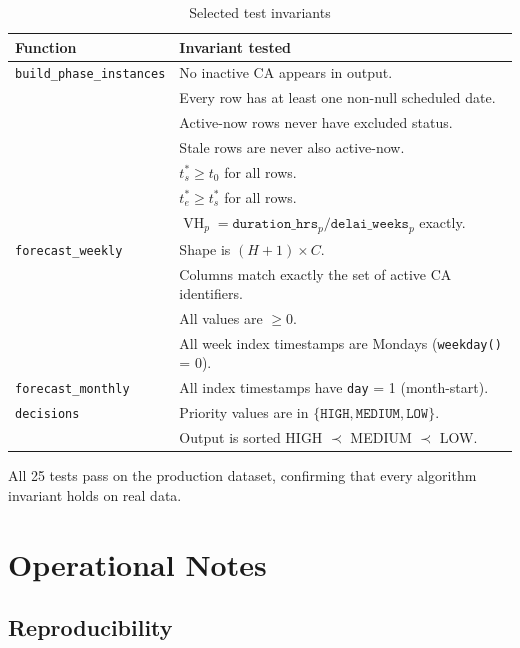 \documentclass[12pt,a4paper]{report}
\DeclareMathOperator{\vh}{VH}
\begin{document}
\begin{table}[H]
\centering
\caption{Selected test invariants}
\begin{tabularx}{\linewidth}{@{} l X @{}}
\toprule
\textbf{Function} & \textbf{Invariant tested} \\
\midrule
\texttt{build\_phase\_instances} &
  No inactive CA appears in output. \\
  &
  Every row has at least one non-null scheduled date. \\
  &
  Active-now rows never have excluded status. \\
  &
  Stale rows are never also active-now. \\
  &
  $t_s^* \geq t_0$ for all rows. \\
  &
  $t_e^* \geq t_s^*$ for all rows. \\
  &
  $\vh_p = \texttt{duration\_hrs}_p / \texttt{delai\_weeks}_p$ exactly. \\[4pt]
\texttt{forecast\_weekly} &
  Shape is $(H + 1) \times C$. \\
  &
  Columns match exactly the set of active CA identifiers. \\
  &
  All values are $\geq 0$. \\
  &
  All week index timestamps are Mondays (\texttt{weekday()} = 0). \\[4pt]
\texttt{forecast\_monthly} &
  All index timestamps have \texttt{day} = 1 (month-start). \\[4pt]
\texttt{decisions} &
  Priority values are in $\{\texttt{HIGH}, \texttt{MEDIUM}, \texttt{LOW}\}$. \\
  &
  Output is sorted HIGH $\prec$ MEDIUM $\prec$ LOW. \\
\bottomrule
\end{tabularx}
\end{table}

All 25 tests pass on the production dataset, confirming that every
algorithm invariant holds on real data.

\chapter{Operational Notes}

\section{Reproducibility}
\end{document}
